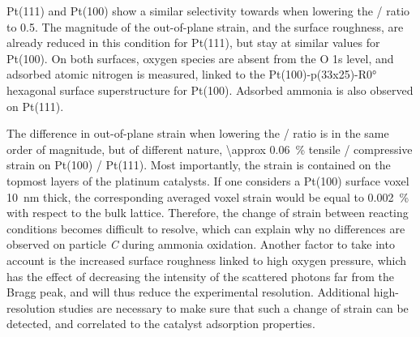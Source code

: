 Pt(111) and Pt(100) show a similar selectivity towards  when lowering the / ratio to \num{0.5}.
The magnitude of the out-of-plane strain, and the surface roughness, are already reduced in this condition for Pt(111), but stay at similar values for Pt(100).
On both surfaces, oxygen species are absent from the O 1s level, and adsorbed atomic nitrogen is measured, linked to the Pt(100)-p(33x25)-R\ang{0} hexagonal surface superstructure for Pt(100).
Adsorbed ammonia is also observed on Pt(111).

The difference in out-of-plane strain when lowering the / ratio is in the same order of magnitude, but of different nature, \qty{\approx 0.06}{\percent} tensile / compressive strain on Pt(100) /  Pt(111).
Most importantly, the strain is contained on the topmost layers of the platinum catalysts.
If one considers a Pt(100) surface voxel \qty{10}{\nm} thick, the corresponding averaged voxel strain would be equal to \qty{0.002}{\percent} with respect to the bulk lattice.
Therefore, the change of strain between reacting conditions becomes difficult to resolve, which can explain why no differences are observed on particle \textit{C} during ammonia oxidation.
Another factor to take into account is the increased surface roughness linked to high oxygen pressure, which has the effect of decreasing the intensity of the scattered photons far from the Bragg peak, and will thus reduce the experimental resolution.
Additional high-resolution studies are necessary to make sure that such a change of strain can be detected, and correlated to the catalyst adsorption properties.


